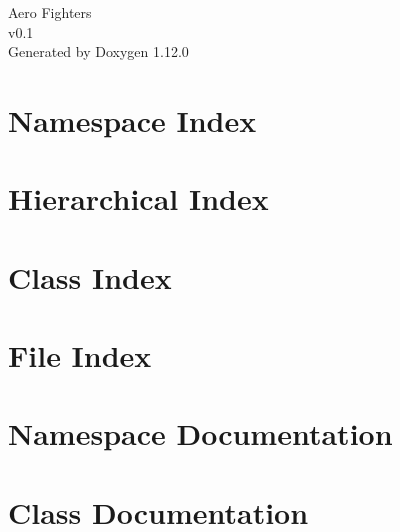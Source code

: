 \documentclass[twoside]{book}
\newcommand{\+}{\discretionary{\mbox{\scriptsize$\hookleftarrow$}}{}{}}
\newcommand{\clearemptydoublepage}{%
    \newpage{\pagestyle{empty}\cleardoublepage}%
  }
\begin{document}
  \raggedbottom
    \hypersetup{pageanchor=false,
                bookmarksnumbered=true,
                pdfencoding=unicode
               }
  \begin{titlepage}
  \vspace*{7cm}
  \begin{center}%
  {\Large Aero Fighters}\\
  [1ex]\large v0.\+1 \\
  \vspace*{1cm}
  {\large Generated by Doxygen 1.12.0}\\
  \end{center}
  \end{titlepage}
  \clearemptydoublepage
  \tableofcontents
  \clearemptydoublepage
  \hypersetup{pageanchor=true}
\chapter{Namespace Index}

\chapter{Hierarchical Index}

\chapter{Class Index}

\chapter{File Index}

\chapter{Namespace Documentation}



\chapter{Class Documentation}
































\end{document}
